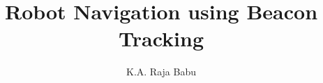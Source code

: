 \documentclass[journal,12pt,twocolumn]{IEEEtran}
\DeclareMathOperator*{\Res}{Res}
\begin{document}
\newtheorem{theorem}{Theorem}[section]
\newtheorem{problem}{Problem}
\newtheorem{proposition}{Proposition}[section]
\newtheorem{lemma}{Lemma}[section]
\newtheorem{corollary}[theorem]{Corollary}
\newtheorem{example}{Example}[section]
\newtheorem{definition}[problem]{Definition}

\newcommand{\BEQA}{\begin{eqnarray}}
\newcommand{\EEQA}{\end{eqnarray}}
\newcommand{\define}{\stackrel{\triangle}{=}}

\providecommand{\mbf}{\mathbf}
\providecommand{\pr}[1]{\ensuremath{\Pr\left(#1\right)}}
\providecommand{\qfunc}[1]{\ensuremath{Q\left(#1\right)}}
\providecommand{\sbrak}[1]{\ensuremath{{}\left[#1\right]}}
\providecommand{\lsbrak}[1]{\ensuremath{{}\left[#1\right.}}
\providecommand{\rsbrak}[1]{\ensuremath{{}\left.#1\right]}}
\providecommand{\brak}[1]{\ensuremath{\left(#1\right)}}
\providecommand{\lbrak}[1]{\ensuremath{\left(#1\right.}}
\providecommand{\rbrak}[1]{\ensuremath{\left.#1\right)}}
\providecommand{\cbrak}[1]{\ensuremath{\left\{#1\right\}}}
\providecommand{\lcbrak}[1]{\ensuremath{\left\{#1\right.}}
\providecommand{\rcbrak}[1]{\ensuremath{\left.#1\right\}}}


\theoremstyle{remark}
\newtheorem{rem}{Remark}
\newcommand{\sgn}{\mathop{\mathrm{sgn}}}
\providecommand{\abs}[1]{\left\vert#1\right\vert}
\providecommand{\res}[1]{\Res\displaylimits_{#1}} 
\providecommand{\norm}[1]{\left\lVert#1\right\rVert}
\providecommand{\mtx}[1]{\mathbf{#1}}
\providecommand{\mean}[1]{E\left[ #1 \right]}
\providecommand{\fourier}{\overset{\mathcal{F}}{ \rightleftharpoons}}
\providecommand{\system}{\overset{\mathcal{H}}{ \longleftrightarrow}}
\newcommand{\solution}{\noindent \textbf{Solution: }}
\newcommand{\cosec}{\,\text{cosec}\,}
\providecommand{\dec}[2]{\ensuremath{\overset{#1}{\underset{#2}{\gtrless}}}}
\newcommand{\myvec}[1]{\ensuremath{\begin{pmatrix}#1\end{pmatrix}}}
\newcommand{\mydet}[1]{\ensuremath{\begin{vmatrix}#1\end{vmatrix}}}
\makeatletter
{}
\makeatother
\let\StandardTheFigure\thefigure
\let\vec\mathbf
\renewcommand{\thefigure}{\theproblem}
\def\putbox#1#2#3{\makebox[0in][l]{\makebox[#1][l]{}\raisebox{\baselineskip}[0in][0in]{\raisebox{#2}[0in][0in]{#3}}}}
     \def\rightbox#1{\makebox[0in][r]{#1}}
     \def\centbox#1{\makebox[0in]{#1}}
     \def\topbox#1{\raisebox{-\baselineskip}[0in][0in]{#1}}
     \def\midbox#1{\raisebox{-0.5\baselineskip}[0in][0in]{#1}}
\vspace{3cm}
\title{Robot Navigation using Beacon Tracking}
\author{K.A. Raja Babu}
\maketitle
\newpage
\bigskip
\renewcommand{\thefigure}{\theenumi}
\renewcommand{\thetable}{\theenumi}
\tableofcontents
\end{document}
